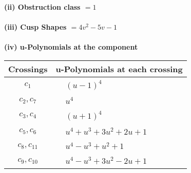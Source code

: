 \documentclass[1p]{elsarticle_modified}
\theoremstyle{definition}
\begin{document}
\flushleft \textbf{(ii) Obstruction class $= 1$}\\~\\
\flushleft \textbf{(iii) Cusp Shapes $= 4 v^2-5 v-1$}\\~\\
\newpage\renewcommand{\arraystretch}{1}
\flushleft \textbf{(iv) u-Polynomials at the component}\newline \\
\begin{tabular}{m{50pt}|m{274pt}}
Crossings & \hspace{64pt}u-Polynomials at each crossing \\
\hline $$\begin{aligned}c_{1}\end{aligned}$$&$\begin{aligned}
&(u-1)^4
\end{aligned}$\\
\hline $$\begin{aligned}c_{2},c_{7}\end{aligned}$$&$\begin{aligned}
&u^4
\end{aligned}$\\
\hline $$\begin{aligned}c_{3},c_{4}\end{aligned}$$&$\begin{aligned}
&(u+1)^4
\end{aligned}$\\
\hline $$\begin{aligned}c_{5},c_{6}\end{aligned}$$&$\begin{aligned}
&u^4+u^3+3 u^2+2 u+1
\end{aligned}$\\
\hline $$\begin{aligned}c_{8},c_{11}\end{aligned}$$&$\begin{aligned}
&u^4- u^3+u^2+1
\end{aligned}$\\
\hline $$\begin{aligned}c_{9},c_{10}\end{aligned}$$&$\begin{aligned}
&u^4- u^3+3 u^2-2 u+1
\end{aligned}$\\
\hline
\end{tabular}\\~\\
\end{document}

